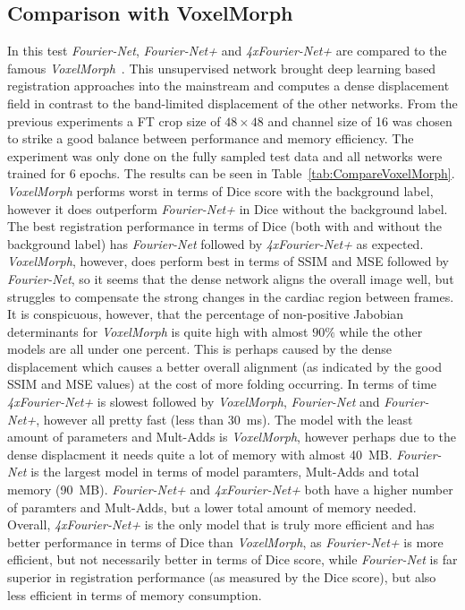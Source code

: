 \documentclass[english,version-2022-01]{uzl-thesis} %
\begin{document}
\subsection{Comparison with VoxelMorph} \label{SubSec:ResultsComparisonVoxelMorph}
In this test \emph{Fourier-Net}, \emph{Fourier-Net+} and \emph{4xFourier-Net+} are compared to the famous \emph{VoxelMorph}~\cite{Voxelmorph}. This unsupervised network brought deep learning based registration approaches into the mainstream and computes a dense displacement field in contrast to the band-limited displacement of the other networks. From the previous experiments a FT crop size of $48 \times 48$ and channel size of 16 was chosen to strike a good balance between performance and memory efficiency. The experiment was only done on the fully sampled test data and all networks were trained for 6 epochs. The results can be seen in Table~\ref{tab:CompareVoxelMorph}.\\
\emph{VoxelMorph} performs worst in terms of Dice score with the background label, however it does outperform \emph{Fourier-Net+} in Dice without the background label. The best registration performance in terms of Dice (both with and without the background label) has \emph{Fourier-Net} followed by \emph{4xFourier-Net+} as expected. \emph{VoxelMorph}, however, does perform best in terms of SSIM and MSE followed by \emph{Fourier-Net}, so it seems that the dense network aligns the overall image well, but struggles to compensate the strong changes in the cardiac region between frames. It is conspicuous, however, that the percentage of non-positive Jabobian determinants for \emph{VoxelMorph} is quite high with almost $90\%$ while the other models are all under one percent. This is perhaps caused by the dense displacement which causes a better overall alignment (as indicated by the good SSIM and MSE values) at the cost of more folding occurring. In terms of time \emph{4xFourier-Net+} is slowest followed by  \emph{VoxelMorph}, \emph{Fourier-Net} and \emph{Fourier-Net+}, however all pretty fast (less than 30~ms). The model with the least amount of parameters and Mult-Adds is \emph{VoxelMorph}, however perhaps due to the dense displacment it needs quite a lot of memory with almost 40~MB. \emph{Fourier-Net} is the largest model in terms of model paramters, Mult-Adds and total memory (90~MB). \emph{Fourier-Net+} and \emph{4xFourier-Net+} both have a higher number of paramters and Mult-Adds, but a lower total amount of memory needed. Overall, \emph{4xFourier-Net+} is the only model that is truly more efficient and has better performance in terms of Dice than \emph{VoxelMorph}, as \emph{Fourier-Net+} is more efficient, but not necessarily better in terms of Dice score, while \emph{Fourier-Net} is far superior in registration performance (as measured by the Dice score), but also less efficient in terms of memory consumption.
\end{document}
